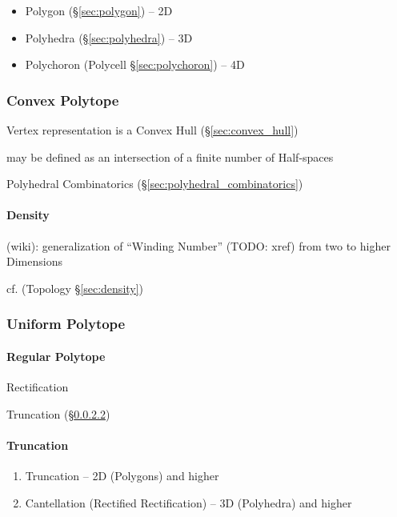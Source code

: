 \begin{itemize}
  \item Polygon (\S\ref{sec:polygon}) -- 2D
  \item Polyhedra (\S\ref{sec:polyhedra}) -- 3D
  \item Polychoron (Polycell \S\ref{sec:polychoron}) -- 4D
\end{itemize}



\subsubsection{Convex Polytope}\label{sec:convex_polytope}

Vertex representation is a Convex Hull (\S\ref{sec:convex_hull})

may be defined as an intersection of a finite number of Half-spaces

\fist Polyhedral Combinatorics (\S\ref{sec:polyhedral_combinatorics})



\paragraph{Density}\label{sec:polytope_density}\hfill

(wiki): generalization of ``Winding Number'' (TODO: xref) from two to higher
Dimensions

cf.  (Topology \S\ref{sec:density})



\subsubsection{Uniform Polytope}\label{sec:uniform_polytope}

\paragraph{Regular Polytope}\label{sec:regular_polytope}\hfill

Rectification

Truncation (\S\ref{sec:truncation_operator})



\paragraph{Truncation}\label{sec:truncation_operator}\hfill

\begin{enumerate}
  \item Truncation -- 2D (Polygons) and higher
  \item Cantellation (Rectified Rectification) -- 3D (Polyhedra) and higher
\end{enumerate}



